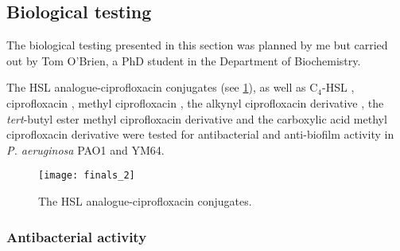 \subsection{Biological testing\label{sec:bio2}}

The biological testing presented in this section was planned by me but carried out by Tom O'Brien, a PhD student in the Department of Biochemistry.

The HSL analogue-ciprofloxacin conjugates (see \ref{fgr:finals_2}), as well as C$_4$-HSL , ciprofloxacin , methyl ciprofloxacin , the alkynyl ciprofloxacin derivative , the \textit{tert}-butyl ester methyl ciprofloxacin derivative  and the carboxylic acid methyl ciprofloxacin derivative  were tested for antibacterial and anti-biofilm activity in \textit{P. aeruginosa} PAO1\cite{Stover2000} and YM64\cite{Morita2001}.

\begin{figure}[H]
	\begin{center}
		\texttt{[image: finals\_2]}
		\caption{The HSL analogue-ciprofloxacin conjugates.
 		\label{fgr:finals_2}}
	\end{center}
\end{figure}

\subsubsection{Antibacterial activity}


